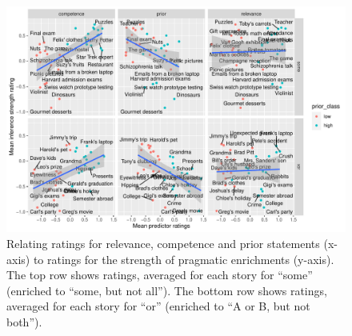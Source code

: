 \documentclass[11pt,letterpaper]{article}
\begin{document}


\begin{figure}
  \includegraphics[scale=0.5]{byItem-ratings.pdf}
 \caption{Relating ratings for relevance, competence and prior statements (x-axis) to
ratings for the strength of pragmatic enrichments (y-axis). The top row shows ratings,
averaged for each story for ``some'' (enriched to ``some, but not all''). The bottom row shows ratings, averaged for each story for ``or'' (enriched to ``A or B, but not both'').}
    \label{by-item-ratings}
\end{figure}
\end{document}
